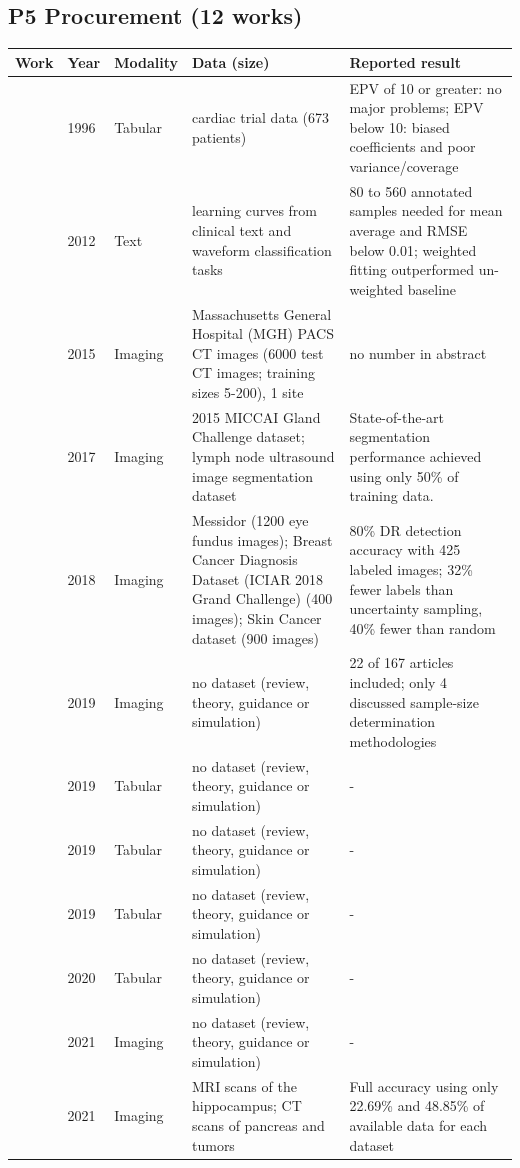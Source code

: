 \subsection*{P5 Procurement (12 works)}
\begin{longtable}{@{}p{2.6cm}p{0.7cm}p{1.2cm}p{4.4cm}p{4.6cm}@{}}
\toprule
Work & Year & Modality & Data (size) & Reported result\\
\midrule
\endhead
\cite{peduzzi1996simulation} & 1996 & Tabular & cardiac trial data (673 patients) & EPV of 10 or greater: no major problems; EPV below 10: biased coefficients and poor variance/coverage\\
\cite{figueroa2012predicting} & 2012 & Text & learning curves from clinical text and waveform classification tasks & 80 to 560 annotated samples needed for mean average and RMSE below 0.01; weighted fitting outperformed un-weighted baseline\\
\cite{cho2015much} & 2015 & Imaging & Massachusetts General Hospital (MGH) PACS CT images (6000 test CT images; training sizes 5-200), 1 site & no number in abstract\\
\cite{yang2017suggestive} & 2017 & Imaging & 2015 MICCAI Gland Challenge dataset; lymph node ultrasound image segmentation dataset & State-of-the-art segmentation performance achieved using only 50\% of training data.\\
\cite{smailagic2018medal} & 2018 & Imaging & Messidor (1200 eye fundus images); Breast Cancer Diagnosis Dataset (ICIAR 2018 Grand Challenge) (400 images); Skin Cancer dataset (900 images) & 80\% DR detection accuracy with 425 labeled images; 32\% fewer labels than uncertainty sampling, 40\% fewer than random\\
\cite{balki2019sample} & 2019 & Imaging & no dataset (review, theory, guidance or simulation) & 22 of 167 articles included; only 4 discussed sample-size determination methodologies\\
\cite{riley2019minimum} & 2019 & Tabular & no dataset (review, theory, guidance or simulation) & -\\
\cite{riley2019minimumsample} & 2019 & Tabular & no dataset (review, theory, guidance or simulation) & -\\
\cite{smeden2019sample} & 2019 & Tabular & no dataset (review, theory, guidance or simulation) & -\\
\cite{riley2020calculating} & 2020 & Tabular & no dataset (review, theory, guidance or simulation) & -\\
\cite{budd2021survey} & 2021 & Imaging & no dataset (review, theory, guidance or simulation) & -\\
\cite{nath2021diminishing} & 2021 & Imaging & MRI scans of the hippocampus; CT scans of pancreas and tumors & Full accuracy using only 22.69\% and 48.85\% of available data for each dataset\\
\bottomrule
\end{longtable}

